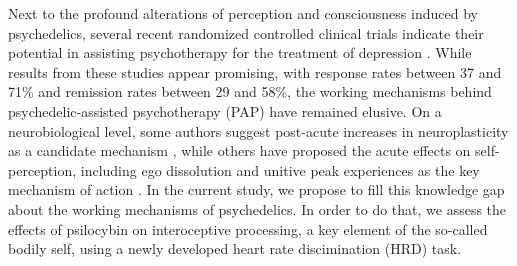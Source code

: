 \documentclass{article}
\begin{document}
Next to the profound alterations of perception and consciousness induced by psychedelics, several recent randomized controlled clinical trials indicate their potential in assisting psychotherapy for the treatment of depression \parencite{Carhart-Harris2021-escital,Davis2020-vj, goodwin2022single, vonrotz2023single}.
While results from these studies appear promising, with response rates between 37 and 71\% and remission rates between 29 and 58\%, the working mechanisms behind psychedelic-assisted psychotherapy (PAP) have remained elusive. On a neurobiological level, some authors suggest post-acute increases in neuroplasticity as a candidate mechanism \parencite{Olson2021-ig}, while others have proposed the acute effects on self-perception, including ego dissolution and unitive peak experiences as the key mechanism of action \parencite{Griffiths2006-hk, milliere2018psychedelics, preller2016phenomenology, Yaden2021-da}.
In the current study, we propose to fill this knowledge gap about the working mechanisms of psychedelics. In order to do that, we assess the effects of psilocybin on interoceptive processing, a key element of the so-called bodily self, using a newly developed heart rate discimination (HRD) task.
\begin{comment}

\begin{verbatim}
    - read millere again and edit this paragraph
\end{verbatim}
However, the majority of investigations and discussions about these effects have focused on the narrative self \parencite{milliere2018psychedelics}, which relates to self-referential processes, including autobiographical memory retrieval and self-reflection \parencite{milliere2018psychedelics, milliere2017looking} and is supported by cortical midline structures pertaining to the default-mode network (DMN).

leaving a knowledge gap regarding the bodily (or embodied) self, a concept relating to the awareness of oneself as an embodied agent situated in space \parencite{legrand2006bodily, seth2013interoceptive}, which might itself underlie the narrative self \parencite{allen2018body}
\begin{verbatim}
    - trying to figure out alternative
\end{verbatim}
\end{comment}
\end{document}
